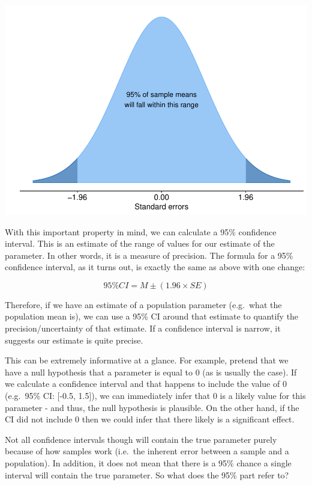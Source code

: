 \documentclass[
]{book}
\begin{document}
\begin{center}\includegraphics{_main_files/figure-latex/unnamed-chunk-87-1} \end{center}

With this important property in mind, we can calculate a 95\% confidence interval. This is an estimate of the range of values for our estimate of the parameter. In other words, it is a measure of precision. The formula for a 95\% confidence interval, as it turns out, is exactly the same as above with one change:

\[
95\% CI = M \pm (1.96 \times SE)
\]

Therefore, if we have an estimate of a population parameter (e.g.~what the population mean is), we can use a 95\% CI around that estimate to quantify the precision/uncertainty of that estimate. If a confidence interval is narrow, it suggests our estimate is quite precise.

This can be extremely informative at a glance. For example, pretend that we have a null hypothesis that a parameter is equal to 0 (as is usually the case). If we calculate a confidence interval and that happens to include the value of 0 (e.g.~95\% CI: {[}-0.5, 1.5{]}), we can immediately infer that 0 is a likely value for this parameter - and thus, the null hypothesis is plausible. On the other hand, if the CI did not include 0 then we could infer that there likely is a significant effect.

Not all confidence intervals though will contain the true parameter purely because of how samples work (i.e.~the inherent error between a sample and a population). In addition, it does not mean that there is a 95\% chance a single interval will contain the true parameter. So what does the 95\% part refer to?
\end{document}
